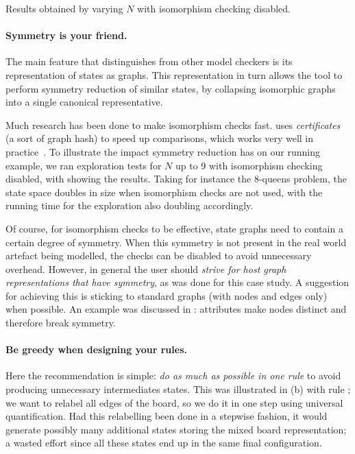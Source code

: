 \begin{table}[t]
\centering
\small

\caption{Results obtained by varying $N$ with isomorphism checking disabled.}
\vspace{-.5cm}
\end{table}

\vspace{-\medskipamount}
\paragraph{Symmetry is your friend.} The main feature that distinguishes
\GROOVE from other model checkers is its representation of states as graphs.
This representation in turn allows the tool to perform symmetry reduction of
similar states, by collapsing isomorphic graphs into a single canonical
representative.

Much research has been done to make isomorphism checks fast. \GROOVE uses
\emph{certificates} (a sort of graph hash) to speed up comparisons, which
works very well in practice~\cite{Ren06}. To illustrate the impact symmetry
reduction has on our running example, we ran exploration tests for $N$ up to 9
with isomorphism checking disabled, with  showing the results.
Taking for instance the 8-queens problem, the state space doubles in size when
isomorphism checks are not used, with the running time for the exploration also
doubling accordingly.

Of course, for isomorphism checks to be effective, state graphs need to contain
a certain degree of symmetry. When this symmetry is not present in the real
world artefact being modelled, the checks can be disabled to avoid unnecessary
overhead. However, in general the user should \emph{strive for host graph
representations that have symmetry}, as was done for this case study. A
suggestion for achieving this is sticking to standard graphs (with nodes and
edges only) when possible. An example was discussed in :
attributes make nodes distinct and therefore break symmetry.

\vspace{-\medskipamount}
\paragraph{Be greedy when designing your rules.} Here the recommendation is
simple: \emph{do as much as possible in one rule} to avoid producing unnecessary
intermediates states. This was illustrated in (b) with rule
; we want to relabel all edges of the board, so we do it in one
step using universal quantification. Had this relabelling been done in a
stepwise fashion, it would generate possibly many additional states storing the
mixed board representation; a wasted effort since all these states end up in
the same final configuration.

